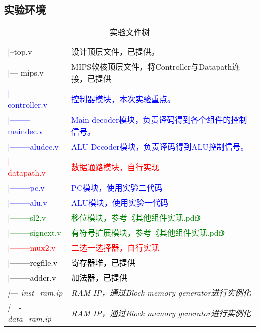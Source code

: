 \subsection{实验环境}
\begin{table}[htbp]
    \centering
    \begin{tabular}{|l|l|}
        \hline
        |--top.v& 设计顶层文件，已提供。 \\
        |----mips.v & MIPS软核顶层文件，将Controller与Datapath连接，已提供 \\
        \textcolor{blue}{|------controller.v} &\textcolor{blue}{ 控制器模块，本次实验重点。} \\
        \textcolor{blue}{|--------maindec.v} & \textcolor{blue}{Main decoder模块，负责译码得到各个组件的控制信号。} \\
        \textcolor{blue}{|--------aludec.v} & \textcolor{blue}{ALU Decoder模块，负责译码得到ALU控制信号。}\\
        \textcolor{red}{|------datapath.v}& \textcolor{red}{数据通路模块，自行实现} \\
        \textcolor{blue}{|--------pc.v} & \textcolor{blue}{PC模块，使用实验二代码} \\
        \textcolor{blue}{|--------alu.v} & \textcolor{blue}{ALU模块，使用实验一代码} \\
        \textcolor{green}{|--------sl2.v} & \textcolor{green}{移位模块，参考《其他组件实现.pdf》} \\
        \textcolor{green}{|--------signext.v} & \textcolor{green}{有符号扩展模块，参考《其他组件实现.pdf》} \\
        \textcolor{red}{|--------mux2.v} & \textcolor{red}{二选一选择器，自行实现} \\
        \textcolor{black}{|--------regfile.v} & \textcolor{black}{寄存器堆，已提供} \\
        \textcolor{black}{|--------adder.v} & \textcolor{black}{加法器，已提供} \\
        \textit{|----inst\_ram.ip} & \textit{RAM IP，通过Block memory generator进行实例化}\\
        \textit{|----data\_ram.ip} & \textit{RAM IP，通过Block memory generator进行实例化}\\
        \hline
    \end{tabular}
    \caption{实验文件树}
    \label{tab:file_tree}
\end{table}